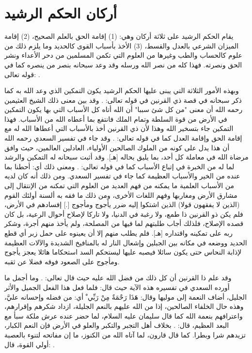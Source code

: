 \section{أركان الحكم الرشيد}

يقام الحكم الرشيد على ثلاثة أركان وهي: (1) إقامة الحق بالعلم الصحيح، (2) إقامة الميزان الشرعي بالعدل والقسط، (3) الأخذ بأسباب القوى كالحديد وما يلزم ذلك من علوم كالحساب والطب وغيرها من العلوم التي تكمن المسلمين من دحر الأعداء ونشر الحق ونصرته. فهذا كله من نصر الله ورسله وقد وعد سبحانه بنصر من ينصره كما في قوله تعالى:
\quranayah*[47][7]{\footnotesize \surahname*[47]}. 

وبهذه الأمور الثلاثة التي يبنى عليها الحكم الرشيد يكون التمكين الذي وعد الله به كما ذكر سبحانه في قصة ذي القرنين في قوله تعالى: 
\quranayah*[18][84-85]{\footnotesize \surahname*[18]}. وقد بين معنى ذلك الشيخ العثيمين رحمه الله أن معنى "من كل شئ سببا" أن الله أتاه كل الأسباب التي بها يكون التمكين في الأرض من قوة السلطة وتمام الملك فانتفع بما أعطاه الله من الأسباب. فهذا التمكين جاء بتسخير الله وهذا لأن ذي القرنين أخذ بالأسباب التي أعطاها الله له مع إقامة الحق وإقامة العدل كما في قوله تعالى: 
\quranayah*[18][87-89]{\footnotesize \surahname*[18]}. وقد جاء في تفسير السعدي رحمه الله أن هذا يدل على كونه من الملوك الصالحين الأولياء، العادلين العالمين، حيث وافق مرضاة الله في معاملة كل أحد، بما يليق بحاله [هـ]. وقد أثبت  سبحانه له التمكين والرشد لما له من الخبرة في إتباع الأسباب كما في قوله تعالى: 
\quranayah*[18][91-92]{\footnotesize \surahname*[18]}. ومعنى ذلك أي: أحطنا بما عنده من الخير والأسباب العظيمة كما جاء في تفسير السعدي. ومن ذلك أنه كان لديه من الأسباب العلمية ما يمكنه من فهم العديد من العلوم التي تمكنه من الإنتقال إلى مشارق الأرض ومغاربها وفهم اللغات الأخرى، ومن ذلك ما فقه به ألسنة أولئك القوم (الذين لا يفقهون قولا) الذين اشتكوا إليه ضرر يأجوج ومأجوج [.] إفسادهم في الأرض، فلم يكن ذو القرنين ذا طمع، ولا رغبة في الدنيا، ولا تاركا لإصلاح أحوال الرعية، بل كان قصده الإصلاح، فلذلك أجاب طلبتهم لما فيها من المصلحة، ولم يأخذ منهم أجرة، وشكر ربه على تمكينه واقتداره [هـ]. فلم يطلب منهم إلا أن يعينوه على حمل زبر أي قطع الحديد ووضعه في مكانه بين الجبلين وإشعال النار له بالمنافيخ الشديدة والآلات العظيمة لإذابة النحاس حتى يكون سائلا فيصبه عليها ليستحكم السد استحكاما هائلا يعجز يأجوج ومأجوج على الصعود فوقه فضلا عن ثقبه. 

وقد علم ذا القرنين أن كل ذلك من فضل الله عليه حيث قال تعالى: 
\quranayah*[18][98]{\footnotesize \surahname*[18]}. وما أجمل ما أورده السعدي في تفسيره هذه الآية حيث قال: 
فلما فعل هذا الفعل الجميل والأثر الجليل، أضاف النعمة إلى موليها وقال: { هَذَا رَحْمَةٌ مِنْ رَبِّي ْ} أي: من فضله وإحسانه عليَّ، وهذه حال الخلفاء الصالحين، إذا من الله عليهم بالنعم الجليلة، ازداد شكرهم وإقرارهم، واعترافهم بنعمة الله كما قال سليمان عليه السلام، لما حضر عنده عرش ملكة سبأ مع البعد العظيم، قال: 
\quranayah*[27][40][19]{\footnotesize \surahname*[27]}.
بخلاف أهل التجبر والتكبر والعلو في الأرض فإن النعم الكبار، تزيدهم شرا وبطرا. كما قال قارون، لما آتاه الله من الكنوز، ما إن مفاتحه لتنوء بالعصبة أولي القوة، قال: 
\quranayah*[28][78][1-6]{\footnotesize \surahname*[28]}. 

